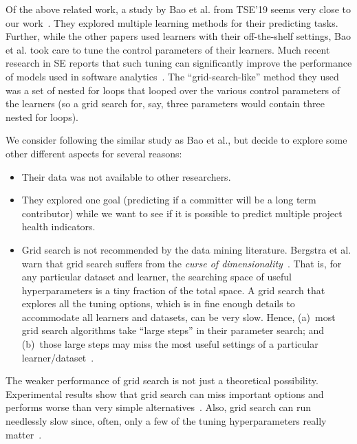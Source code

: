 \documentclass[sigconf,review,anonymous]{acmart}
\newcommand{\bi}{\begin{itemize}}
\newcommand{\ei}{\end{itemize}}
\begin{document}
Of the above related work, a study by 
Bao et al. from TSE'19 seems very close to our work~\cite{bao2019large}. 
They explored multiple learning methods for their predicting tasks.
Further, while the other papers used learners with their off-the-shelf settings, Bao et al. took care to tune the control
parameters of their learners.
Much recent research in SE reports that such tuning can significantly improve the performance of models used in software analytics~\cite{Tantithamthavorn16,fu2016differential,Fu2016TuningFS,agrawal2018betterdata,agrawal2019dodge,agrawal2018better}. The ``grid-search-like'' method they used was a set of nested for loops that looped over the various control parameters of the learners (so a grid search for, say, three parameters would contain three nested for loops). 

We consider following the similar study as Bao et al., but decide to explore some other different aspects for several reasons:


    
    
\bi
\item
Their data was not available to other researchers. 
\item
They explored one goal (predicting if a committer will be a long term contributor) while we want to see if it is possible to predict multiple project health indicators.
\item
Grid search is not recommended by the data mining literature. Bergstra et al. warn that grid search suffers from the \textit{curse of dimensionality}~\cite{bergstra2011algorithms}. That is, for any particular dataset and learner, the searching space of useful hyperparameters is a tiny fraction of the total space. A grid search that explores all the tuning options, which is in fine enough details
to accommodate all learners and datasets, can be very slow.
Hence, (a)~most grid search algorithms take ``large steps'' in their parameter search; and (b)~those large steps may miss the most useful settings
of a particular learner/dataset~\cite{bergstra2011algorithms}.
\ei
The weaker performance of grid search is not just a theoretical possibility. Experimental results show that  grid search can   miss important options and performs worse than very simple alternatives~\cite{fu2016differential}. Also, grid search can run needlessly slow since,
often, only a few of the tuning hyperparameters really matter~\cite{Bergstra:2012}. 
\end{document}
